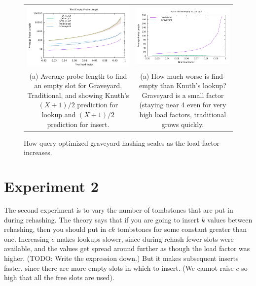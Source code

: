 \documentclass[10pt]{article}
\theoremstyle{remark}
\theoremstyle{remark}
\newcommand{\figlabel}[1]{\label{fig:#1}}
\begin{document}
\begin{figure}
\begin{center}
\begin{tabular}{cc}
  \\
  \includegraphics[width=75mm]{experiments/increasing-load-findempty} &
  \includegraphics[width=75mm]{experiments/increasing-load-findempty-ratio}  \\
  \begin{minipage}{75mm}
    \footnotesize (a) Average probe length to find an empty slot for
    Graveyard, Traditional, and showing Knuth's $(X+1)/2$ prediction
    for lookup and $(X+1)/2$ prediction for insert.
  \end{minipage}
  &
  \begin{minipage}{75mm}
    \footnotesize (a) How much worse is find-empty than Knuth's
    lookup?  Graveyard is a small factor (staying near 4 even for very
    high load factors, traditional grows quickly.
  \end{minipage}
 
  \end{tabular}
\end{center}
\caption{How query-optimized graveyard hashing scales as the load factor increases.}
\figlabel{probelengths}
\end{figure}

\section{Experiment 2}

The second experiment is to vary the number of tombstones that are put
in during rehashing.  The theory \cite{BenderKuKu22} says that if you
are going to insert $k$ values between rehashing, then you should put
in $ck$ tombstones for some constant greater than one.  Increasing $c$
makes lookups slower, since during rehash fewer slots were available,
and the values get spread around further as though the load factor was
higher.  (TODO: Write the expression down.)  But it makes subsequent
inserts faster, since there are more empty slots in which to insert.
(We cannot raise $c$ so high that all the free slots are used).
\end{document}
